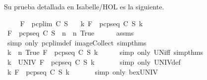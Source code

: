 \begin{isabellebody}
\begin{isamarkuptext}
  Su prueba detallada en Isabelle/HOL es la siguiente.%
\end{isamarkuptext}\isamarkuptrue%
\isamarkupfalse%
\ \isanewline
\ \ \ {\isachardoublequoteopen}F\ {\isasymin}\ pcp{\isacharunderscore}lim\ C\ S{\isachardoublequoteclose}\isanewline
\ \ \ {\isachardoublequoteopen}{\isasymexists}k{\isachardot}\ F\ {\isasymin}\ pcp{\isacharunderscore}seq\ C\ S\ k{\isachardoublequoteclose}\ \isanewline
%
\isadelimproof
%
\endisadelimproof
%
\isatagproof
{}\isamarkupfalse%
\ {\isacharminus}\isanewline
\ \ \isamarkupfalse%
\ {\isachardoublequoteopen}F\ {\isasymin}\ {\isasymUnion}{\isacharparenleft}{\isacharparenleft}pcp{\isacharunderscore}seq\ C\ S{\isacharparenright}\ {\isacharbackquote}\ {\isacharbraceleft}n\ {\isacharbar}\ n{\isachardot}\ True{\isacharbraceright}{\isacharparenright}{\isachardoublequoteclose}\isanewline
\ \ \ \ \isamarkupfalse%
\ assms\ \isamarkupfalse%
\ {\isacharparenleft}simp\ only{\isacharcolon}\ pcp{\isacharunderscore}lim{\isacharunderscore}def\ image{\isacharunderscore}Collect\ simp{\isacharunderscore}thms{\isacharparenleft}{}{}{\isacharparenright}{\isacharparenright}\isanewline
\ \ \isamarkupfalse%
\ \isamarkupfalse%
\ {\isachardoublequoteopen}{\isasymexists}k\ {\isasymin}\ {\isacharbraceleft}n{\isachardot}\ True{\isacharbraceright}{\isachardot}\ F\ {\isasymin}\ pcp{\isacharunderscore}seq\ C\ S\ k{\isachardoublequoteclose}\isanewline
\ \ \ \ \isamarkupfalse%
\ {\isacharparenleft}simp\ only{\isacharcolon}\ UN{\isacharunderscore}iff\ simp{\isacharunderscore}thms{\isacharparenleft}{}{}{\isacharparenright}{\isacharparenright}\isanewline
\ \ \isamarkupfalse%
\ \isamarkupfalse%
\ {\isachardoublequoteopen}{\isasymexists}k\ {\isasymin}\ UNIV{\isachardot}\ F\ {\isasymin}\ pcp{\isacharunderscore}seq\ C\ S\ k{\isachardoublequoteclose}\ \isanewline
\ \ \ \ \isamarkupfalse%
\ {\isacharparenleft}simp\ only{\isacharcolon}\ UNIV{\isacharunderscore}def{\isacharparenright}\isanewline
\ \ \isamarkupfalse%
\ {\isachardoublequoteopen}{\isasymexists}k{\isachardot}\ F\ {\isasymin}\ pcp{\isacharunderscore}seq\ C\ S\ k{\isachardoublequoteclose}\ \isanewline
\ \ \ \ \isamarkupfalse%
\ {\isacharparenleft}simp\ only{\isacharcolon}\ bex{\isacharunderscore}UNIV{\isacharparenright}\isanewline
{}\isamarkupfalse%
%
\endisatagproof

\end{isabellebody}
